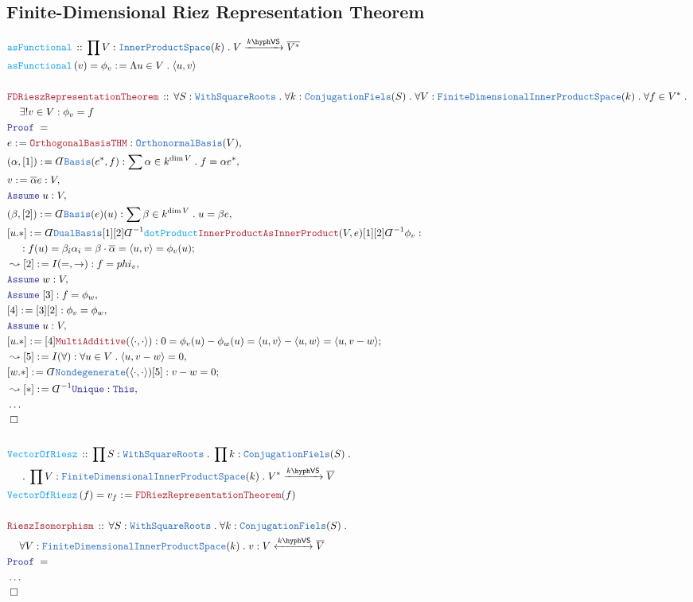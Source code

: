 \documentclass[12pt]{scrartcl}%
\newcommand{\TYPE}[1]{\textcolor{NavyBlue}{\mathtt{#1}}}%
\newcommand{\FUNC}[1]{\textcolor{Cerulean}{\mathtt{#1}}}%
\newcommand{\LOGIC}[1]{\textcolor{Blue}{\mathtt{#1}}}%
\newcommand{\THM}[1]{\textcolor{Maroon}{\mathtt{#1}}}%
\renewcommand{\.}{\; . \;} %
\newcommand{\de}{: \kern 0.1pc =} %
\newcommand{\Act}[1]{\left( #1 \right)} %
\newcommand{\Theorem}[2]{& \THM{#1} \, :: \, #2 \\ & \Proof = \\ } %
\newcommand{\DeclareFunc}[2]{& \FUNC{#1} \, :: \, #2 \\}%
\newcommand{\DefineNamedFunc}[4]{&  \FUNC{#1}\Act{#2} = #3 \de #4 \\}%
\newcommand{\NewLine}{\\ & \kern 1pc}%
\newcommand{\Page}[1]{ \begin{align*} #1 \end{align*}  }%
\newcommand{ \bd }{ \ByDef }%
\newcommand{\NoProof}{ & \ldots \\ \EndProof}%
\newcommand{\Say}[3]{& #1 \de #2 : #3, \\} %
\newcommand{\Conclude}[3]{& #1 \de #2 : #3; \\}%
\newcommand{\Derive}[3]{& \leadsto #1 \de #2 : #3, \\} %
\newcommand{\Assume}[2]{& \LOGIC{Assume} \; #1 : #2, \\} %
\newcommand{\QED}{\; \square} %
\newcommand{\EndProof}{& \QED \\} %
\newcommand{\ByDef}{\rotatebox[origin=c]{-180}{$D$}}%
\newcommand{\Proof}{\LOGIC{Proof} \; } %
\newcommand{\Arrow}[1]{\xrightarrow{#1}}%
\newcommand{\ToIso}[1]{\xleftrightarrow{#1}}%
\newcommand{\IPS}{\TYPE{InnerProductSpace}}
\newcommand{\OBasis}{\TYPE{OrthonormalBasis}}
\newcommand{\FDIPS}{\TYPE{FiniteDimensionalInnerProductSpace}}
\newcommand{\VS}[1]{#1\hyph\mathsf{VS}} %
\begin{document}
\subsection{Finite-Dimensional Riez Representation Theorem}
\Page{
	\DeclareFunc{asFunctional}{\prod V : \IPS(k) \. V \Arrow{\VS{k}} \overline{V^*} }
	\DefineNamedFunc{asFunctional}{v}{\phi_v}{ \Lambda u \in V \. \langle u,v\rangle}             
	\\
	\Theorem{FDRieszRepresentationTheorem}{ \forall S : \TYPE{WithSquareRoots} \. \forall k : \TYPE{ConjugationFiels}(S) \. \forall V : \FDIPS(k) \. \forall f \in V^* \. \NewLine \exists! v \in V : \phi_v = f }
	\Say{e}{\THM{OrthogonalBasisTHM}}{\OBasis(V)}
	\Say{(\alpha,[1])}{\bd \TYPE{Basis}(e^*,f)}{\sum \alpha \in k^{\dim V} \. f = \alpha e^*}
	\Say{v}{\overline{\alpha}e}{V}
	\Assume{u}{V}
	\Say{(\beta,[2])}{\bd \TYPE{Basis}(e)(u)}{\sum \beta \in k^{\dim V} \. u = \beta e}
	\Conclude{[u.*]}{\bd \TYPE{DualBasis}[1][2]\bd^{-1}\FUNC{dotProduct}\THM{InnerProductAsInnerProduct}(V,e)[1][2]\bd^{-1}\phi_v}{
		\NewLine : f(u) = \beta_i \alpha_i = \beta \cdot \overline{\alpha} = \langle u, v \rangle = \phi_v(u)}
	\Derive{[2]}{I(=,\to)}{ f = phi_v }
	\Assume{w}{V}
	\Assume{[3]}{f = \phi_w}
	\Say{[4]}{[3][2]}{\phi_v = \phi_w}
	\Assume{u}{V}
	\Conclude{[u.*]}{[4]\THM{MultiAdditive}(\langle \cdot,\cdot\rangle)}{  0 = \phi_v(u) - \phi_w(u) = \langle u, v \rangle - \langle u, w\rangle = \langle u, v - w\rangle}
	\Derive{[5]}{I(\forall)}{\forall u \in V \. \langle u, v - w\rangle = 0 }
	\Conclude{[w.*]}{\bd \TYPE{Nondegenerate}(\langle \cdot, \cdot \rangle)[5]}{ v - w = 0}
	\Derive{[*]}{\bd^{-1}\LOGIC{Unique}}{\LOGIC{This}}
	\NoProof
	\\
	\DeclareFunc{VectorOfRiesz}{\prod  S : \TYPE{WithSquareRoots} \. \prod k : \TYPE{ConjugationFiels}(S) \.  \NewLine \.\prod V : \FDIPS(k) \. V^* \Arrow{\VS{k}} \overline{V}}
	\DefineNamedFunc{VectorOfRiesz}{f}{v_f}{\THM{FDRiezRepresentationTheorem}(f)}
	\\
	\Theorem{RieszIsomorphism}{ \forall S : \TYPE{WithSquareRoots} \. \forall k : \TYPE{ConjugationFiels}(S)  \. \NewLine \forall V : \FDIPS(k) \. v : V \ToIso{\VS{k}} \overline{V} }
	\NoProof
}
\newpage
\end{document}
